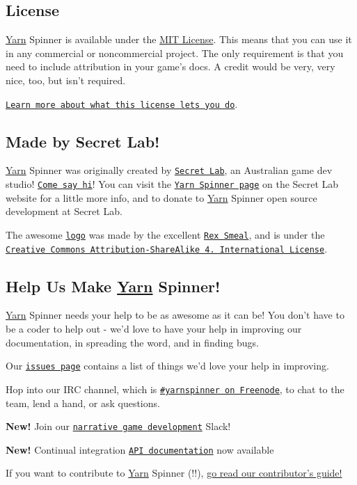 \subsection*{License}

\hyperlink{a00040}{Yarn} Spinner is available under the \hyperlink{a00030}{M\-I\-T License}. This means that you can use it in any commercial or noncommercial project. The only requirement is that you need to include attribution in your game's docs. A credit would be very, very nice, too, but isn't required.


\begin{DoxyItemize}
\item \href{https://tldrlegal.com/license/mit-license}{\tt Learn more about what this license lets you do}.
\end{DoxyItemize}

\subsection*{Made by Secret Lab!}

\hyperlink{a00040}{Yarn} Spinner was originally created by \href{http://secretlab.com.au}{\tt Secret Lab}, an Australian game dev studio! \href{https://twitter.com/thesecretlab}{\tt Come say hi}! You can visit the \href{http://www.secretlab.com.au/yarnspinner}{\tt Yarn Spinner page} on the Secret Lab website for a little more info, and to donate to \hyperlink{a00040}{Yarn} Spinner open source development at Secret Lab.

The awesome \href{Documentation/YarnSpinnerLogo.png}{\tt logo} was made by the excellent \href{https://twitter.com/RexSmeal}{\tt Rex Smeal}, and is under the \href{http://creativecommons.org/licenses/by-sa/4.0/}{\tt Creative Commons Attribution-\/\-Share\-Alike 4. International License}.

\subsection*{Help Us Make \hyperlink{a00040}{Yarn} Spinner!}

\hyperlink{a00040}{Yarn} Spinner needs your help to be as awesome as it can be! You don't have to be a coder to help out -\/ we'd love to have your help in improving our documentation, in spreading the word, and in finding bugs.


\begin{DoxyItemize}
\item Our \href{https://github.com/thesecretlab/YarnSpinner/issues}{\tt issues page} contains a list of things we'd love your help in improving.
\item Hop into our I\-R\-C channel, which is \href{https://webchat.freenode.net/?channels=yarnspinner}{\tt \#yarnspinner on Freenode}, to chat to the team, lend a hand, or ask questions.
\item {\bfseries New!} Join our \href{http://lab.to/narrativegamedev}{\tt narrative game development} Slack!
\item {\bfseries New!} Continual integration \href{https://thesecretlab.github.io/YarnSpinner/html/}{\tt A\-P\-I documentation} now available
\end{DoxyItemize}

If you want to contribute to \hyperlink{a00040}{Yarn} Spinner (!!), \hyperlink{a00002}{go read our contributor's guide!} 
